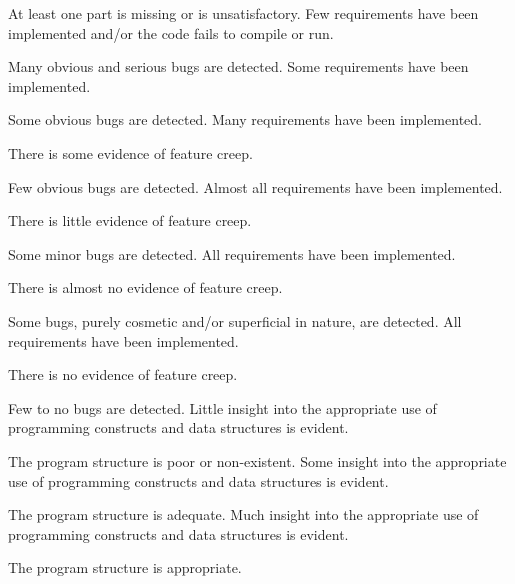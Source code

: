 \documentclass{../../fal_assignment}
\begin{document}
\rubricyeartwo
\begin{markingrubric}
		\grade\fail At least one part is missing or is unsatisfactory.
%
        \grade \fail Few requirements have been implemented  and/or the code fails to compile or run.
            \par Many obvious and serious bugs are detected.
        \grade Some requirements have been implemented.
            \par Some obvious bugs are detected.
        \grade Many requirements have been implemented.
            \par There is some evidence of feature creep.
            \par Few obvious bugs  are detected.
        \grade Almost all requirements have been implemented.
            \par There is little evidence of feature creep.
            \par Some minor bugs  are detected.
        \grade All requirements have been implemented.
            \par There is almost no evidence of feature creep.
            \par Some bugs, purely cosmetic and/or superficial in nature, are detected.
        \grade All requirements have been implemented.
            \par There is no evidence of feature creep.
            \par Few to no bugs are detected.
%
        \grade \fail Little insight into the appropriate use of programming constructs and data structures is evident.
            \par The program structure is poor or non-existent.
        \grade Some insight into the appropriate use of programming constructs and data structures is evident.
            \par The program structure is adequate.
        \grade Much insight into the appropriate use of programming constructs and data structures is evident.
            \par The program structure is appropriate.

\end{markingrubric}
\end{document}
